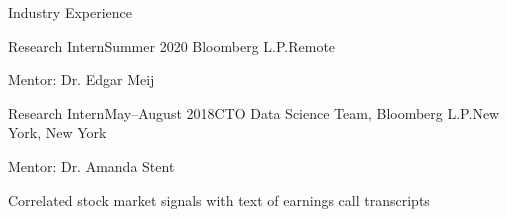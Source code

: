 \documentclass{resume} %
\begin{document}
\begin{rSection}{Industry Experience}

\begin{rSubsection}{Research Intern}{Summer 2020}{ Bloomberg L.P.}{Remote}
\item Mentor: Dr. Edgar Meij
\end{rSubsection}

\begin{rSubsection}{Research Intern}{May--August 2018}{CTO Data Science Team, Bloomberg L.P.}{New York, New York}
\item Mentor: Dr. Amanda Stent
\item Correlated stock market signals with text of earnings call transcripts 
\end{rSubsection}

\end{rSection}

\end{document}
